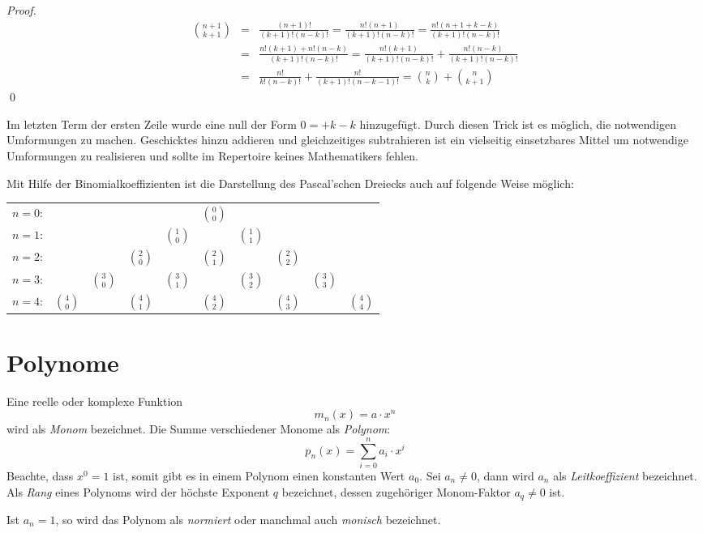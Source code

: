 \begin{proof}
\begin{eqnarray*}
\binom{n+1}{k+1} &=& \frac{(n+1)!}{(k+1)!(n-k)!} = \frac{n!(n+1)}{(k+1)!(n-k)!} = \frac{n!(n+1+k-k)}{(k+1)!(n-k)!} \\
&=& \frac{n!(k+1) +n!(n-k)}{(k+1)!(n-k)!} = \frac{n!(k+1)}{(k+1)!(n-k)!}+\frac{n!(n-k)}{(k+1)!(n-k)!} \\
&=& \frac{n!}{k!(n-k)!} + \frac{n!}{(k+1)!(n-k-1)!} = \binom{n}{k}+\binom{n}{k+1}
\end{eqnarray*}\qed
\end{proof}

\HandRight \qquad Im letzten Term der ersten Zeile wurde eine null der Form $0=+k-k$ hinzugefügt. Durch diesen Trick ist es möglich, die notwendigen Umformungen zu machen. Geschicktes hinzu addieren und gleichzeitiges subtrahieren ist ein vielseitig einsetzbares Mittel um notwendige Umformungen zu realisieren und sollte im Repertoire keines Mathematikers fehlen. 

\bigskip

Mit Hilfe der Binomialkoeffizienten ist die Darstellung des Pascal'schen Dreiecks auch auf folgende Weise möglich:

\begin{center}
\begin{tabular}{rccccccccc} 
$n=0$:& & & & & $\binom{0}{0}$\\
\noalign{\smallskip} $n=1$:& & & & $\binom{1}{0}$ & & $\binom{1}{1}$\\
\noalign{\smallskip} $n=2$:& & & $\binom{2}{0}$ & & $\binom{2}{1}$ & & $\binom{2}{2}$\\
\noalign{\smallskip} $n=3$:& & $\binom{3}{0}$ & & $\binom{3}{1}$ & & $\binom{3}{2}$ & & $\binom{3}{3}$\\
\noalign{\smallskip} $n=4$:& $\binom{4}{0}$ & & $\binom{4}{1}$ & & $\binom{4}{2}$ & & $\binom{4}{3}$ & & $\binom{4}{4}$
\end{tabular}
\end{center}


\section{Polynome}\label{chap:poly}

\begin{definition}
Eine reelle oder komplexe Funktion
\[ m_n(x) = a\cdot x^n  \]
wird als \textsl{Monom} bezeichnet. Die Summe verschiedener Monome als \textsl{Polynom}:
\[
p_n(x) = \sum_{i=0}^{n} a_i \cdot x^i
\]
Beachte, dass $x^0 = 1$ ist, somit gibt es in einem Polynom einen konstanten Wert $a_0$. Sei $a_n\ne 0$, dann wird $a_n$ als \textsl{Leitkoeffizient} bezeichnet. Als \textsl{Rang} eines Polynoms wird der höchste Exponent $q$ bezeichnet, dessen zugehöriger Monom-Faktor $a_q \ne 0$ ist.

Ist $a_n = 1$, so wird das Polynom als \textsl{normiert} oder manchmal auch \textsl{monisch} bezeichnet.
\end{definition}


